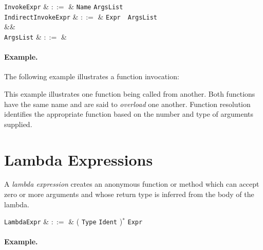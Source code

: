 
\begin{syntax}
  \verb+InvokeExpr+ & $::=$ & \verb+Name+ \token{(} \verb+ArgsList+ \token{)}\\
  \verb+IndirectInvokeExpr+ & $::=$ & \verb+Expr+\ \token{(}\ \verb+ArgsList+\ \token{)}\\
&&\\
\verb+ArgsList+ & $::=$ & \\
\end{syntax}

\paragraph{Example.}

The following example illustrates a function invocation:



This example illustrates one function being called from another.  Both functions have the same name and are said to {\em overload} one another.  Function resolution identifies the appropriate function based on the number and type of arguments supplied.  


\section{Lambda Expressions}
\label{c_expr_lambda}

A {\em lambda expression} creates an anonymous function or method which can accept zero or more arguments and whose return type is inferred from the body of the lambda.

\begin{syntax}
  \verb+LambdaExpr+ & $::=$ & \token{\&} \token{(} \big( \verb+Type+ \verb+Ident+ \big)$^*$ \token{->} \verb+Expr+ \token{)}\\
\end{syntax}

\paragraph{Example.}

